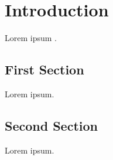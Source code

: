 \chapter{Introduction}
\label{chap:introduction}


Lorem ipsum \cite{ferreira_patterns_2008}.

\section{First Section}

Lorem ipsum.

\section{Second Section}

Lorem ipsum.